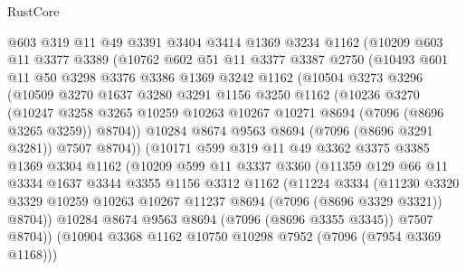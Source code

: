 \begin{lexlean}{RustCore}
\begin{coremodule}
        @603
        @319
        @11
        @49
        @3391
        @3404
        @3414
        @1369
        @3234
        @1162
        (@10209
          @603
          @11
          @3377
          @3389
          (@10762
            @602
            @51
            @11
            @3377
            @3387
            @2750
            (@10493
              @601
              @11
              @50
              @3298
              @3376
              @3386
              @1369
              @3242
              @1162
              (@10504
                @3273
                @3296
                (@10509
                  @3270
                  @1637
                  @3280
                  @3291
                  @1156
                  @3250
                  @1162
                  (@10236
                    @3270
                    (@10247
                      @3258
                      @3265
                      @10259
                      @10263
                      @10267
                      @10271
                      @8694
                      (@7096 (@8696 @3265 @3259))
                      @8704))
                  @10284
                  @8674
                  @9563
                  @8694
                  (@7096 (@8696 @3291 @3281))
                  @7507
                  @8704))
              (@10171
                @599
                @319
                @11
                @49
                @3362
                @3375
                @3385
                @1369
                @3304
                @1162
                (@10209
                  @599
                  @11
                  @3337
                  @3360
                  (@11359
                    @129
                    @66
                    @11
                    @3334
                    @1637
                    @3344
                    @3355
                    @1156
                    @3312
                    @1162
                    (@11224
                      @3334
                      (@11230
                        @3320
                        @3329
                        @10259
                        @10263
                        @10267
                        @11237
                        @8694
                        (@7096 (@8696 @3329 @3321))
                        @8704))
                    @10284
                    @8674
                    @9563
                    @8694
                    (@7096 (@8696 @3355 @3345))
                    @7507
                    @8704))
                (@10904 @3368 @1162 @10750 @10298 @7952 (@7096 (@7954 @3369 @1168)))

\end{coremodule}
\end{lexlean}
